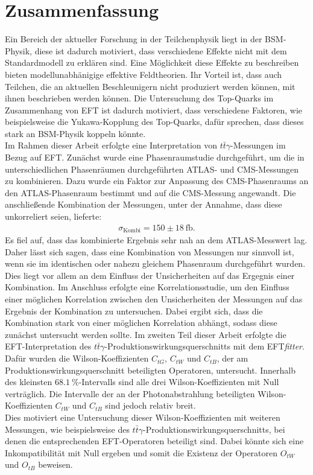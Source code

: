 \chapter{Zusammenfassung}
Ein Bereich der aktueller Forschung in der Teilchenphysik liegt in der BSM-Physik, diese ist dadurch motiviert, dass verschiedene Effekte nicht mit dem Standardmodell zu erklären sind. Eine Möglichkeit diese Effekte zu beschreiben bieten modellunabhänigige effektive Feldtheorien. Ihr Vorteil ist, dass auch Teilchen, die an aktuellen Beschleunigern nicht produziert werden können, mit ihnen beschrieben werden können. Die Untersuchung des Top-Quarks im Zusammenhang von EFT ist dadurch motiviert, dass verschiedene Faktoren, wie beispielsweise die Yukawa-Kopplung des Top-Quarks, dafür sprechen, dass dieses stark an BSM-Physik koppeln könnte. \\
Im Rahmen dieser Arbeit erfolgte eine Interpretation von $t\bar{t}\gamma$-Messungen im Bezug auf EFT. Zunächst wurde eine Phasenraumstudie durchgeführt, um die in unterschiedlichen Phasenräumen durchgeführten ATLAS- und CMS-Messungen zu kombinieren. Dazu wurde ein Faktor zur Anpassung des CMS-Phasenraums an den ATLAS-Phasenraum bestimmt und auf die CMS-Messung angewandt. Die anschließende Kombination der Messungen, unter der Annahme, dass diese unkorreliert seien, lieferte:
\begin{align*}
  \sigma_{\text{Kombi}} = 150 \pm 18~ \si{\femto\barn}.
\end{align*}
Es fiel auf, dass das kombinierte Ergebnis sehr nah an dem ATLAS-Messwert lag. Daher lässt sich sagen, dass eine Kombination von Messungen nur sinnvoll ist, wenn sie im identischen oder nahezu gleichem Phasenraum durchgeführt wurden. Dies liegt vor allem an dem Einfluss der Unsicherheiten auf das Ergegnis einer Kombination. Im Anschluss erfolgte eine Korrelationsstudie, um den Einfluss einer möglichen Korrelation zwischen den Unsicherheiten der Messungen auf das Ergebnis der Kombination zu untersuchen. Dabei ergibt sich, dass die Kombination stark von einer möglichen Korrelation abhängt, sodass diese zunächst untersucht werden sollte.
Im zweiten Teil dieser Arbeit erfolgte die EFT-Interpretation des $t\bar{t}\gamma$-Produktionswirkungsquerschnitts mit dem EFT\textit{fitter}. Dafür wurden die Wilson-Koeffizienten $C_{tG}$, $C_{tW}$ und $C_{tB}$, der am Produktionswirkungsquerschnitt beteiligten Operatoren, untersucht. Innerhalb des kleinsten $\SI{68.1}{\percent}$-Intervalls sind alle drei Wilson-Koeffizienten mit Null verträglich. Die Intervalle der an der Photonabstrahlung beteiligten Wilson-Koeffizienten $C_{tW}$ und $C_{tB}$ sind jedoch relativ breit.\\
Dies motiviert eine Untersuchung dieser Wilson-Koeffizienten mit weiteren Messungen, wie beispielsweise des $t\bar{t}\gamma$-Produktionswirkungsquerschnitts, bei denen die entsprechenden EFT-Operatoren beteiligt sind. Dabei könnte sich eine Inkompatibilität mit Null ergeben und somit die Existenz der Operatoren $O_{tW}$ und $O_{tB}$ beweisen.
